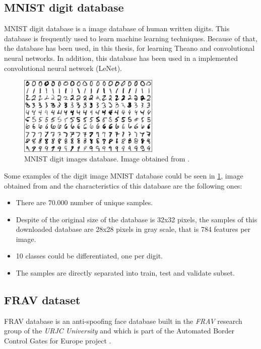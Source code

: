 \subsection{MNIST digit database}\label{subsec:MNIST}
MNIST digit database is a image database of human written digits. This database is frequently used to learn machine learning techniques. Because of that, the database has been used, in this thesis, for learning Theano and convolutional neural networks. In addition, this database has been used in a implemented convolutional neural network (LeNet).\\
\begin{figure}[htb]
\centering
\includegraphics[width=0.6\textwidth]{images_databases/mnistExamples.png}
\caption{MNIST digit images database. Image obtained from \cite{MNISTimage}.} \label{fig:MNIST_digits}
\end{figure}
Some examples of the digit image MNIST database could be seen in \ref{fig:MNIST_digits}, image obtained from \cite{MNISTimage} and the characteristics of this database are the following ones:
\begin{itemize}[itemsep=2pt,topsep=8pt,parsep=0pt,partopsep=20pt]
 \item There are 70.000 number of unique samples.
 \item Despite of the original size of the database is 32x32 pixels, the samples of this downloaded database are 28x28 pixels in gray scale, that is 784 features per image.
 \item 10 classes could be differentiated, one per digit.
\item The samples are directly separated into train, test and validate subset.
\end{itemize}

\subsection{FRAV dataset}
FRAV database is an anti-spoofing face database built in the  \textit{FRAV} research group of the \textit{URJC University} and which is part of the Automated Border Control Gates for Europe project \cite{ABC4EU}.\\

